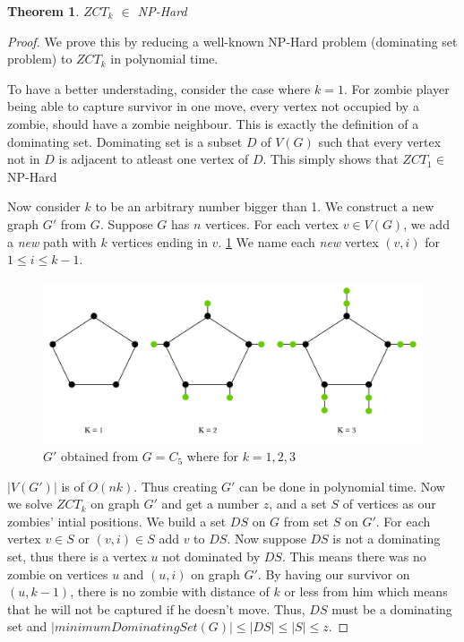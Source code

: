 \documentclass[1p]{elsarticle}
\newtheorem{theorem}{Theorem}
\begin{document}
	\begin{theorem}
		$ZCT_k$ $\in$ NP-Hard
	\end{theorem}
	\begin{proof}
		We prove this by reducing a well-known NP-Hard problem (dominating set problem) to $ZCT_k$ in polynomial time.

		To have a better understading, consider the case where $k=1$. For zombie player being able to capture survivor in
		one move, every vertex not occupied by a zombie, should have a zombie neighbour. This is exactly the definition
		of a dominating set. Dominating set is a subset $D$ of $V(G)$ such that every vertex not in $D$ is adjacent to
		atleast one vertex of $D$. This simply shows that $ZCT_1 \in$ NP-Hard 

		Now consider $k$ to be an arbitrary number bigger than 1. We construct a new graph $G'$ from $G$. Suppose $G$
		has $n$ vertices. For each vertex $v \in V(G)$, we add a {\it new} path with $k$ vertices ending in $v$.
		\ref{fig:p7} We name each {\it new} vertex $(v,i)$ for $1 \leq i \leq k - 1$.
		
		\begin{figure}[h!]
			\centering
			\includegraphics[width=0.9\linewidth]{fig/ZCT.png}
			\caption{$G'$ obtained from $G = C_5$ where for $k = 1,2,3$}
			\label{fig:p7}
		\end{figure}		


		$|V(G')|$ is of $O(nk)$. Thus creating $G'$ can be done in polynomial time. Now we solve $ZCT_k$ on graph $G'$
		and get a number $z$, and a set $S$ of vertices as our zombies' intial positions. We build a set $DS$ on $G$
		from set $S$ on $G'$. For each vertex $v \in S$ or $(v,i) \in S$ add $v$ to $DS$. Now suppose $DS$ is not a
		dominating set, thus there is a vertex $u$ not dominated by $DS$. This means there was no zombie on vertices $u$
		and $(u,i)$ on graph $G'$. By having our survivor on $(u,k-1)$, there is no zombie with distance of $k$ or less
		from him which means that he will not be captured if he doesn't move. Thus, $DS$ must be a dominating set and $
		|minimumDominatingSet(G)| \leq |DS| \leq |S| \leq z$.


\end{proof}
\end{document}
